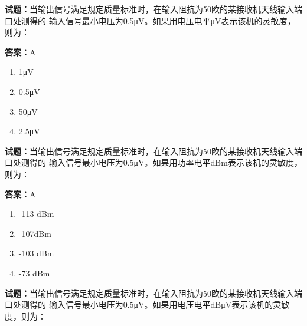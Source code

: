 \documentclass{ctexbook}
\begin{document}




\vspace{1em}

\textbf{试题：}当输出信号满足规定质量标准时，在输入阻抗为50欧的某接收机天线输入端口处测得的
输入信号最小电压为0.5μV。如果用电压电平μV表示该机的灵敏度，则为： 

\textbf{答案：}A 

\begin{enumerate}[leftmargin=3em]
  \item 1μV 

  \item 0.5μV 

  \item 50μV 

  \item 2.5μV 

\end{enumerate}





\vspace{1em}

\textbf{试题：}当输出信号满足规定质量标准时，在输入阻抗为50欧的某接收机天线输入端口处测得的
输入信号最小电压为0.5μV。如果用功率电平dBm表示该机的灵敏度，则为： 

\textbf{答案：}A 


\begin{enumerate}[leftmargin=3em]
  \item -113 dBm 

  \item -107dBm 

  \item -103 dBm 

  \item -73 dBm 

\end{enumerate}





\vspace{1em}

\textbf{试题：}当输出信号满足规定质量标准时，在输入阻抗为50欧的某接收机天线输入端口处测得的
输入信号最小电压为0.5μV。如果用电压电平dBμV表示该机的灵敏度，则为： 
\end{document}
